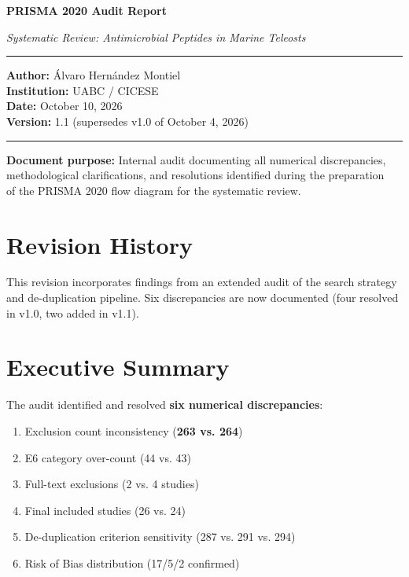 \documentclass[11pt, a4paper]{article}
\begin{document}
\begin{titlepage}
    \centering
    \vspace*{2cm}
    {\Huge\bfseries\color{prismablue} PRISMA 2020 Audit Report\par}
    \vspace{0.5cm}
    {\Large\itshape Systematic Review: Antimicrobial Peptides in Marine Teleosts\par}
    \vspace{2cm}
    \rule{\textwidth}{0.5pt}
    \vspace{0.5cm}
    {\large
    \textbf{Author:} Álvaro Hernández Montiel\\
    \textbf{Institution:} UABC / CICESE\\
    \textbf{Date:} October 10, 2026\\
    \textbf{Version:} 1.1 (supersedes v1.0 of October 4, 2026)
    \par}
    \vspace{2cm}
    \rule{\textwidth}{0.5pt}
    \vfill
    {\small
    \textbf{Document purpose:} Internal audit documenting all numerical discrepancies,\\
    methodological clarifications, and resolutions identified during the preparation\\
    of the PRISMA 2020 flow diagram for the systematic review.
    \par}
    \vspace{1cm}
\end{titlepage}

\tableofcontents
\newpage

\section{Revision History}

\begin{keybox}
This revision incorporates findings from an extended audit of the search strategy and de-duplication pipeline. Six discrepancies are now documented (four resolved in v1.0, two added in v1.1).
\end{keybox}

\section{Executive Summary}

The audit identified and resolved \textbf{six numerical discrepancies}:

\begin{enumerate}[label=(\arabic*)]
    \item Exclusion count inconsistency (\textbf{263 vs. 264})
    \item E6 category over-count (44 vs. 43)
    \item Full-text exclusions (2 vs. 4 studies)
    \item Final included studies (26 vs. 24)
    \item De-duplication criterion sensitivity (287 vs. 291 vs. 294)
    \item Risk of Bias distribution (17/5/2 confirmed)
\end{enumerate}
\end{document}
